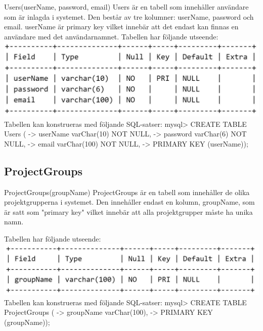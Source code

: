 \documentclass[paper=a4, fontsize=11pt,twoside]{article}
\begin{document}
 Users(userName, password, email)
  Users är en tabell som innehåller användare som är inlagda i systemet. Den består av tre    
  kolumner: userName, password och email. userName är primary key vilket innebär att det     
  endast kan finnas en användare med det användarnamnet.\newline
 Tabellen har följande utseende:\newline
\newline
\includegraphics{UsersTable}
\newline
Tabellen kan konstrueras med följande SQL-satser:
\newline
mysql> CREATE TABLE Users (\newline
    -> userName varChar(10) NOT NULL,\newline
    -> password varChar(6) NOT NULL,\newline
    -> email varChar(100) NOT NULL,\newline
    -> PRIMARY KEY (userName));

\subsection{ProjectGroups}
 ProjectGroups(groupName)\newline
   ProjectGroups är en tabell som innehåller de olika projektgrupperna i systemet. Den    
   innehåller endast en kolumn, groupName, som är satt som "primary key" vilket innebär att alla 
   projektgrupper måste ha unika namn.\newline

  Tabellen har följande utseende:
\newline
\includegraphics{ProjectGroupsTable}
\newline
\newline
Tabellen kan konstrueras med följande SQL-satser:\newline
mysql> CREATE TABLE ProjectGroups (\newline
    -> groupName varChar(100),\newline
    -> PRIMARY KEY (groupName));
\end{document}
